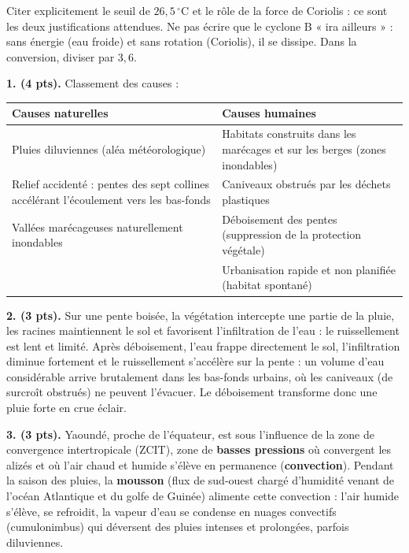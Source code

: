 \documentclass[11pt]{article}
\newcommand{\cle}[1]{{\popxbold\color{popdark}#1}}
\begin{document}
\begin{attention}
Citer explicitement le seuil de $26,5\,^\circ$C et le rôle de la force de Coriolis : ce sont les deux justifications attendues. Ne pas écrire que le cyclone B « ira ailleurs » : sans énergie (eau froide) et sans rotation (Coriolis), il se dissipe. Dans la conversion, diviser par $3,6$.
\end{attention}

\begin{corrige}
\textbf{1. (4 pts).} Classement des causes :
\begin{center}
\begin{tabularx}{\linewidth}{|X|X|}
\hline
\rowcolor{popblueL} \textbf{Causes naturelles} & \textbf{Causes humaines} \\
\hline
Pluies diluviennes (aléa météorologique) & Habitats construits dans les marécages et sur les berges (zones inondables) \\
\hline
Relief accidenté : pentes des sept collines accélérant l'écoulement vers les bas-fonds & Caniveaux obstrués par les déchets plastiques \\
\hline
Vallées marécageuses naturellement inondables & Déboisement des pentes (suppression de la protection végétale) \\
\hline
 & Urbanisation rapide et non planifiée (habitat spontané) \\
\hline
\end{tabularx}
\end{center}

\textbf{2. (3 pts).} Sur une pente boisée, la végétation intercepte une partie de la pluie, les racines maintiennent le sol et favorisent l'\cle{infiltration} de l'eau : le ruissellement est lent et limité. Après déboisement, l'eau frappe directement le sol, l'infiltration diminue fortement et le \cle{ruissellement} s'accélère sur la pente : un volume d'eau considérable arrive brutalement dans les bas-fonds urbains, où les caniveaux (de surcroît obstrués) ne peuvent l'évacuer. Le déboisement transforme donc une pluie forte en crue éclair.

\textbf{3. (3 pts).} Yaoundé, proche de l'équateur, est sous l'influence de la zone de convergence intertropicale (ZCIT), zone de \textbf{basses pressions} où convergent les alizés et où l'air chaud et humide s'élève en permanence (\textbf{convection}). Pendant la saison des pluies, la \textbf{mousson} (flux de sud-ouest chargé d'humidité venant de l'océan Atlantique et du golfe de Guinée) alimente cette convection : l'air humide s'élève, se refroidit, la vapeur d'eau se condense en nuages convectifs (cumulonimbus) qui déversent des pluies intenses et prolongées, parfois diluviennes.


\end{corrige}
\end{document}
